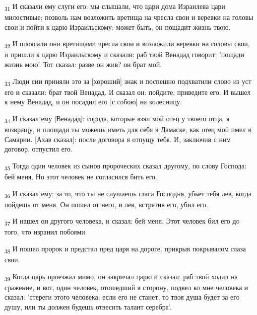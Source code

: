 \begin{tcolorbox}
\textsubscript{31} И сказали ему слуги его: мы слышали, что цари дома Израилева цари милостивые; позволь нам возложить вретища на чресла свои и веревки на головы свои и пойти к царю Израильскому; может быть, он пощадит жизнь твою.
\end{tcolorbox}
\begin{tcolorbox}
\textsubscript{32} И опоясали они вретищами чресла свои и возложили веревки на головы свои, и пришли к царю Израильскому и сказали: раб твой Венадад говорит: 'пощади жизнь мою'. Тот сказал: разве он жив? он брат мой.
\end{tcolorbox}
\begin{tcolorbox}
\textsubscript{33} Люди сии приняли это за [хороший] знак и поспешно подхватили слово из уст его и сказали: брат твой Венадад. И сказал он: пойдите, приведите его. И вышел к нему Венадад, и он посадил его [с собою] на колесницу.
\end{tcolorbox}
\begin{tcolorbox}
\textsubscript{34} И сказал ему [Венадад]: города, которые взял мой отец у твоего отца, я возвращу, и площади ты можешь иметь для себя в Дамаске, как отец мой имел в Самарии. [Ахав сказал]: после договора я отпущу тебя. И, заключив с ним договор, отпустил его.
\end{tcolorbox}
\begin{tcolorbox}
\textsubscript{35} Тогда один человек из сынов пророческих сказал другому, по слову Господа: бей меня. Но этот человек не согласился бить его.
\end{tcolorbox}
\begin{tcolorbox}
\textsubscript{36} И сказал ему: за то, что ты не слушаешь гласа Господня, убьет тебя лев, когда пойдешь от меня. Он пошел от него, и лев, встретив его, убил его.
\end{tcolorbox}
\begin{tcolorbox}
\textsubscript{37} И нашел он другого человека, и сказал: бей меня. Этот человек бил его до того, что изранил побоями.
\end{tcolorbox}
\begin{tcolorbox}
\textsubscript{38} И пошел пророк и предстал пред царя на дороге, прикрыв покрывалом глаза свои.
\end{tcolorbox}
\begin{tcolorbox}
\textsubscript{39} Когда царь проезжал мимо, он закричал царю и сказал: раб твой ходил на сражение, и вот, один человек, отошедший в сторону, подвел ко мне человека и сказал: 'стереги этого человека; если его не станет, то твоя душа будет за его душу, или ты должен будешь отвесить талант серебра'.
\end{tcolorbox}
